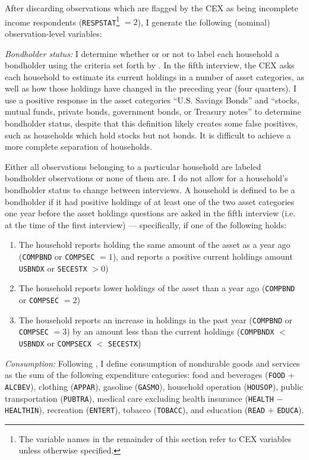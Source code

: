 After discarding observations which are flagged by the CEX as being incomplete income respondents (\texttt{RESPSTAT}\footnote{The variable names in the remainder of this section refer to CEX variables unless otherwise specified.} $= 2$), I generate the following (nominal) observation-level variables:

\textit{Bondholder status:} I determine whether or or not to label each household a bondholder using the criteria set forth by \cite{vissing02}. In the fifth interview, the CEX asks each household to estimate its current holdings in a number of asset categories, as well as how those holdings have changed in the preceding year (four quarters). I use a positive response in the asset categories ``U.S. Savings Bonds'' and ``stocks, mutual funds, private bonds, government bonds, or Treasury notes'' to determine bondholder status, despite that this definition likely creates some false positives, such as households which hold stocks but not bonds. It is difficult to achieve a more complete separation of households.

Either all observations belonging to a particular household are labeled bondholder observations or none of them are. I do not allow for a household's bondholder status to change between interviews. A household is defined to be a bondholder if it had positive holdings of at least one of the two asset categories one year before the asset holdings questions are asked in the fifth interview (i.e. at the time of the first interview) --- specifically, if one of the following holds:
\begin{enumerate}
\item The household reports holding the same amount of the asset as a year ago (\texttt{COMPBND} or \texttt{COMPSEC} $= 1$), and reports a positive current holdings amount \texttt{USBNDX} or \texttt{SECESTX} $> 0$)
\item The household reports lower holdings of the asset than a year ago (\texttt{COMPBND} or \texttt{COMPSEC} $= 2$)
\item The household reports an increase in holdings in the past year (\texttt{COMPBND} or \texttt{COMPSEC} $= 3$) by an amount less than the current holdings (\texttt{COMPBNDX} $<$ \texttt{USBNDX} or \texttt{COMPSECX} $<$ \texttt{SECESTX})
\end{enumerate}

\textit{Consumption:} Following \cite{heathcote10}, I define consumption of nondurable goods and services as the sum of the following expenditure categories: food and beverages (\texttt{FOOD} $+$ \texttt{ALCBEV}), clothing (\texttt{APPAR}), gasoline (\texttt{GASMO}), household operation (\texttt{HOUSOP}), public transportation (\texttt{PUBTRA}), medical care excluding health insurance (\texttt{HEALTH} $-$ \texttt{HEALTHIN}), recreation (\texttt{ENTERT}), tobacco (\texttt{TOBACC}), and education (\texttt{READ} $+$ \texttt{EDUCA}).


